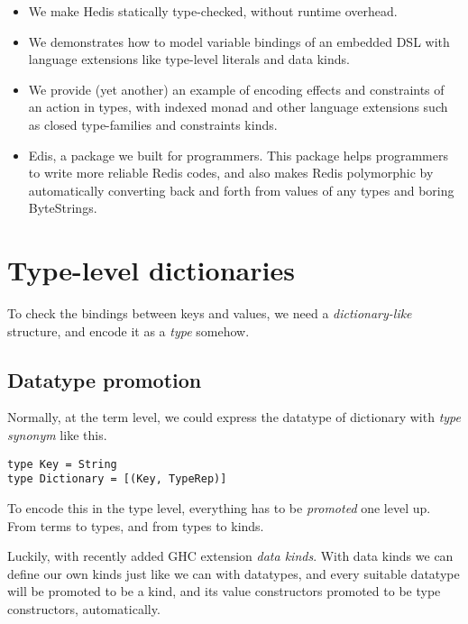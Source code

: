 \documentclass[pldi]{sigplanconf-pldi16}
\begin{document}
\begin{itemize}[noitemsep]
\item We make Hedis statically type-checked, without runtime overhead.
\item We demonstrates how to model variable bindings of an embedded DSL with
language extensions like type-level literals and data kinds.
\item We provide (yet another) an example of encoding effects and
 constraints of an action in types, with indexed monad\cite{indexedmonad}
  and other language extensions such as closed
  type-families\cite{closedtypefamilies} and constraints
  kinds\cite{constraintskinds}.
\item Edis, a package we built for programmers. This package helps programmers
 to write more reliable Redis codes, and also makes Redis polymorphic by
 automatically converting back and forth from values of any types and boring
 ByteStrings.
\end{itemize}

\section{Type-level dictionaries}

To check the bindings between keys and values, we need a \emph{dictionary-like}
structure, and encode it as a \emph{type} somehow.

\subsection{Datatype promotion}
Normally, at the term level, we could express the datatype of dictionary with
\emph{type synonym} like this.\footnotemark

\begin{verbatim}
type Key = String
type Dictionary = [(Key, TypeRep)]
\end{verbatim}


To encode this in the type level, everything has to be
\emph{promoted}\cite{promotion} one level up.
From terms to types, and from types to kinds.

Luckily, with recently added GHC extension \emph{data kinds}. With data kinds
we can define our own kinds just like we can with datatypes, and every suitable
datatype will be promoted to be a kind, and its value constructors promoted
to be type constructors, automatically.
\end{document}
